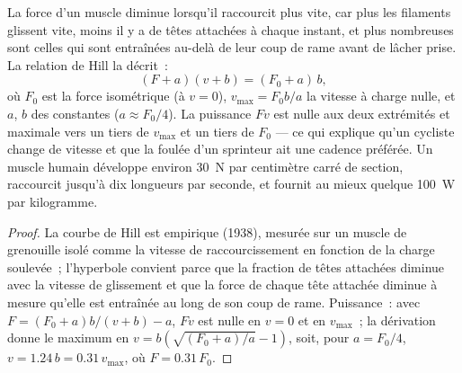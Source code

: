 \begin{theorem}\label{thm:b2:muscle-movement:hill}
La force d'un muscle diminue lorsqu'il raccourcit plus vite, car plus
les filaments glissent vite, moins il y a de têtes attachées à chaque
instant, et plus nombreuses sont celles qui sont entraînées au-delà de
leur coup de rame avant de lâcher prise. La relation de Hill la décrit~:
\[
(F + a)(v + b) = (F_0 + a)\,b,
\]
où $F_0$ est la force isométrique (à $v = 0$), $v_{\max} =
F_0 b/a$ la vitesse à charge nulle, et $a$, $b$ des constantes ($a \approx
F_0/4$). La puissance $Fv$ est nulle aux deux extrémités et maximale
vers un tiers de $v_{\max}$ et un tiers de $F_0$ --- ce qui explique
qu'un cycliste change de vitesse et que la foulée d'un sprinteur ait une
cadence préférée. Un muscle humain développe environ \qty{30}{N} par
centimètre carré de section, raccourcit jusqu'à dix longueurs par
seconde, et fournit au mieux quelque \qty{100}{W} par kilogramme.
\end{theorem}
\begin{proof}
La courbe de Hill est empirique (1938), mesurée sur un muscle de
grenouille isolé comme la vitesse de raccourcissement en fonction de la
charge soulevée~; l'hyperbole convient parce que la fraction de têtes
attachées diminue avec la vitesse de glissement et que la force de chaque
tête attachée diminue à mesure qu'elle est entraînée au long de son coup
de rame. Puissance~: avec $F = (F_0 + a)b/(v + b) - a$, $Fv$ est nulle en
$v = 0$ et en $v_{\max}$~; la dérivation donne le maximum en
$v = b(\sqrt{(F_0 + a)/a} - 1)$, soit, pour $a = F_0/4$, $v =
1.24\,b = 0.31\,v_{\max}$, où $F = 0.31\,F_0$.
\end{proof}


